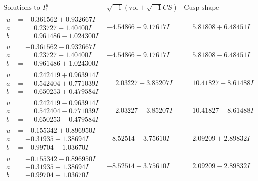 \documentclass[1p]{elsarticle_modified}
\theoremstyle{definition}
\newcommand{\I}{\sqrt{-1}}
\begin{document}
$$\begin{array}{c|c|c}  
\text{Solutions to }I^u_{1}& \I (\text{vol} + \sqrt{-1}CS) & \text{Cusp shape}\\
 \hline 
\begin{aligned}
u &= -0.361562 + 0.932667 I \\
a &= \phantom{-}0.23727 - 1.40400 I \\
b &= \phantom{-}0.961486 - 1.024300 I\end{aligned}
 & -4.54866 - 9.17617 I & \phantom{-}5.81808 + 6.48451 I \\ \hline\begin{aligned}
u &= -0.361562 - 0.932667 I \\
a &= \phantom{-}0.23727 + 1.40400 I \\
b &= \phantom{-}0.961486 + 1.024300 I\end{aligned}
 & -4.54866 + 9.17617 I & \phantom{-}5.81808 - 6.48451 I \\ \hline\begin{aligned}
u &= \phantom{-}0.242419 + 0.963914 I \\
a &= \phantom{-}0.542404 + 0.771039 I \\
b &= \phantom{-}0.650253 + 0.479584 I\end{aligned}
 & \phantom{-}2.03227 + 3.85207 I & \phantom{-}10.41827 - 8.61488 I \\ \hline\begin{aligned}
u &= \phantom{-}0.242419 - 0.963914 I \\
a &= \phantom{-}0.542404 - 0.771039 I \\
b &= \phantom{-}0.650253 - 0.479584 I\end{aligned}
 & \phantom{-}2.03227 - 3.85207 I & \phantom{-}10.41827 + 8.61488 I \\ \hline\begin{aligned}
u &= -0.155342 + 0.896950 I \\
a &= -0.31935 + 1.38694 I \\
b &= -0.99704 + 1.03670 I\end{aligned}
 & -8.52514 - 3.75610 I & \phantom{-}2.09209 + 2.89832 I \\ \hline\begin{aligned}
u &= -0.155342 - 0.896950 I \\
a &= -0.31935 - 1.38694 I \\
b &= -0.99704 - 1.03670 I\end{aligned}
 & -8.52514 + 3.75610 I & \phantom{-}2.09209 - 2.89832 I \\ \hline\begin{aligned}

\end{aligned}
\end{array}$$
\end{document}
